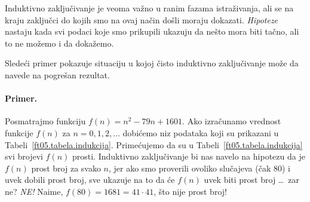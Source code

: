 Induktivno zaklju\v civanje je veoma va\v zno u ranim fazama istra\v zivanja, ali se na kraju
zaklju\v cci do kojih smo na ovaj na\v cin do\v sli moraju dokazati. \emph{Hipoteze} nastaju kada
svi podaci koje smo prikupili ukazuju da ne\v sto mora biti ta\v cno, ali to ne mo\v zemo
i da doka\v zemo.

Slede\'ci primer pokazuje situaciju u kojoj \v cisto induktivno zaklju\v civanje mo\v ze da navede na
pogre\v san rezultat.

\paragraph{Primer.}
Posmatrajmo funkciju $f(n) = n^2 - 79n + 1601$. Ako izra\v cunamo vrednost funkcije
$f(n)$ za $n = 0, 1, 2, \ldots$ dobi\'cemo niz podataka koji su prikazani u Tabeli~\ref{ft05.tabela.indukcija}.
Prime\'cujemo da su u Tabeli~\ref{ft05.tabela.indukcija} svi brojevi $f(n)$ prosti. Induktivno zaklju\v civanje
bi nas navelo na hipotezu da je $f(n)$ prost broj za svako $n$, jer ako smo proverili ovoliko
slu\v cajeva (\v cak 80) i uvek dobili prost broj, sve ukazuje na to da \'ce
$f(n)$ uvek biti prost broj \ldots\ zar ne?
\emph{NE!} Naime, $f(80) = 1681 = 41 \cdot 41$, \v sto nije prost broj!


